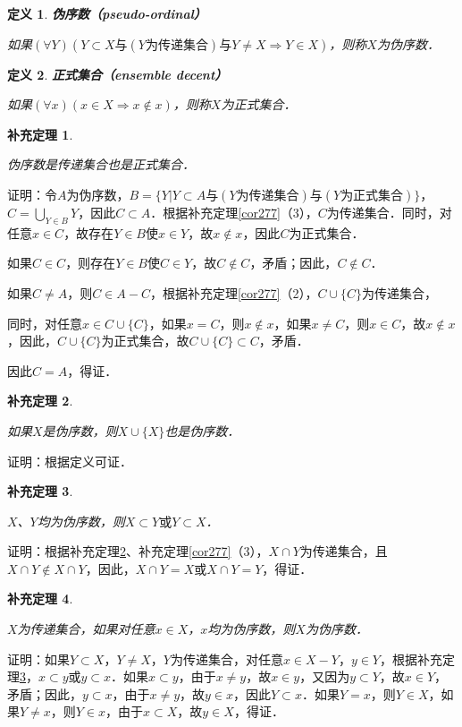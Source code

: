 \documentclass[12pt, a4paper, oneside]{book}
\newtheorem{cor}{补充定理}
\newtheorem{de}{定义}
\begin{document}
			\begin{de}
				\textbf{伪序数（pseudo-ordinal）}
				\par
				如果$(\forall Y)(Y\subset X\text{与}(Y\text{为传递集合})\text{与}Y\neq X\Rightarrow Y\in X)$，则称$X$为伪序数．
			\end{de}
									
			\begin{de}
				\textbf{正式集合（ensemble decent）}
				\par
				如果$(\forall x)(x\in X\Rightarrow x\notin x)$，则称$X$为正式集合．
			\end{de}
			
			\begin{cor}\label{cor278}
				\hfill\par
				伪序数是传递集合也是正式集合．
			\end{cor}
			证明：令$A$为伪序数，$B=\{Y|Y\subset A\text{与}(Y\text{为传递集合})\text{与}(Y\text{为正式集合})\}$，$C=\bigcup\limits_{Y\in B}Y$，因此$C\subset A$．根据补充定理\ref{cor277}（3），$C$为传递集合．同时，对任意$x \in C$，故存在$Y\in B$使$x \in Y$，故$x \notin x$，因此$C$为正式集合．
			\par
			如果$C\in C$，则存在$Y\in B$使$C\in Y$，故$C\notin C$，矛盾；因此，$C\notin C$．
			\par
			如果$C\neq A$，则$C\in A-C$，根据补充定理\ref{cor277}（2），$C\cup \{C\}$为传递集合，
			\par
			同时，对任意$x \in C\cup \{C\}$，如果$x=C$，则$x \notin x$，如果$x \neq C$，则$x \in C$，故$x \notin x$，因此，$C\cup \{C\}$为正式集合，故$C\cup \{C\}\subset C$，矛盾．
			\par
			因此$C=A$，得证．
			
			\begin{cor}\label{cor279}
				\hfill\par
				如果$X$是伪序数，则$X\cup \{X\}$也是伪序数．
			\end{cor}
			证明：根据定义可证．
			
			\begin{cor}\label{cor280}
				\hfill\par
				$X$、$Y$均为伪序数，则$X\subset Y\text{或}Y\subset X$．
			\end{cor}
			证明：根据补充定理\ref{cor279}、补充定理\ref{cor277}（3），$X\cap Y$为传递集合，且$X\cap Y\notin X\cap Y$，因此，$X\cap Y=X\text{或}X\cap Y=Y$，得证．
			
			\begin{cor}\label{cor281}
				\hfill\par
				$X$为传递集合，如果对任意$x\in X$，$x$均为伪序数，则$X$为伪序数．
			\end{cor}
			证明：如果$Y\subset X$，$Y\neq X$，$Y$为传递集合，对任意$x\in X-Y$，$y\in Y$，根据补充定理\ref{cor280}，$x\subset y\text{或}y\subset x$．如果$x\subset y$，由于$x\neq y$，故$x\in y$，又因为$y\subset Y$，故$x\in Y$，矛盾；因此，$y\subset x$，由于$x\neq y$，故$y\in x$，因此$Y\subset x$．如果$Y=x$，则$Y\in X$，如果$Y\neq x$，则$Y\in x$，由于$x\subset X$，故$y\in X$，得证．
			
\end{document}
